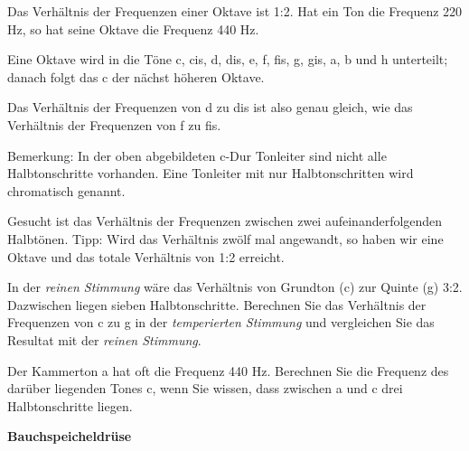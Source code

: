 Das Verhältnis der Frequenzen einer Oktave ist 1:2. Hat ein Ton \zB
die Frequenz 220 Hz, so hat seine Oktave die Frequenz 440 Hz.

Eine Oktave wird in die Töne c, cis, d, dis, e, f, fis, g, gis, a, b und h
unterteilt; danach folgt das c der nächst höheren Oktave.

Das Verhältnis der Frequenzen von d zu dis ist also genau gleich, wie
das Verhältnis der Frequenzen von f zu fis.

Bemerkung:  In der oben
abgebildeten c-Dur Tonleiter sind nicht alle Halbtonschritte
vorhanden. Eine Tonleiter mit nur Halbtonschritten wird chromatisch
genannt.

\begin{bbwAufgabenBlock}

\item Gesucht ist das Verhältnis der Frequenzen zwischen zwei aufeinanderfolgenden Halbtönen. Tipp: Wird
  das Verhältnis zwölf mal angewandt, so haben wir eine Oktave und das
  totale Verhältnis von 1:2 erreicht.


\item In der \textit{reinen Stimmung} wäre das Verhältnis von Grundton
  (c) zur Quinte (g) 3:2. Dazwischen liegen sieben
  Halbtonschritte. Berechnen Sie das Verhältnis der Frequenzen von c zu
  g in der \textit{temperierten Stimmung} und vergleichen Sie das
  Resultat mit der \textit{reinen Stimmung}.

  


\item Der Kammerton a hat oft die Frequenz 440 Hz. Berechnen Sie die
  Frequenz des darüber liegenden Tones c, wenn Sie wissen, dass
  zwischen a und c drei Halbtonschritte liegen.


    
\end{bbwAufgabenBlock}
\platzFuerBerechnungenBisEndeSeite{}

\bbwActAufgabenNr{} \textbf{Bauchspeicheldrüse}

